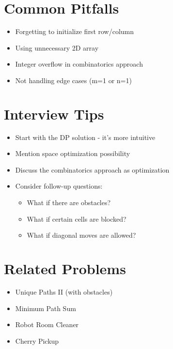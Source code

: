 \section*{Common Pitfalls}
\begin{itemize}
    \item Forgetting to initialize first row/column
    \item Using unnecessary 2D array
    \item Integer overflow in combinatorics approach
    \item Not handling edge cases (m=1 or n=1)
\end{itemize}

\section*{Interview Tips}
\begin{itemize}
    \item Start with the DP solution - it's more intuitive
    \item Mention space optimization possibility
    \item Discuss the combinatorics approach as optimization
    \item Consider follow-up questions:
        \begin{itemize}
            \item What if there are obstacles?
            \item What if certain cells are blocked?
            \item What if diagonal moves are allowed?
        \end{itemize}
\end{itemize}

\section*{Related Problems}
\begin{itemize}
    \item Unique Paths II (with obstacles)
    \item Minimum Path Sum
    \item Robot Room Cleaner
    \item Cherry Pickup
\end{itemize}

\printindex
